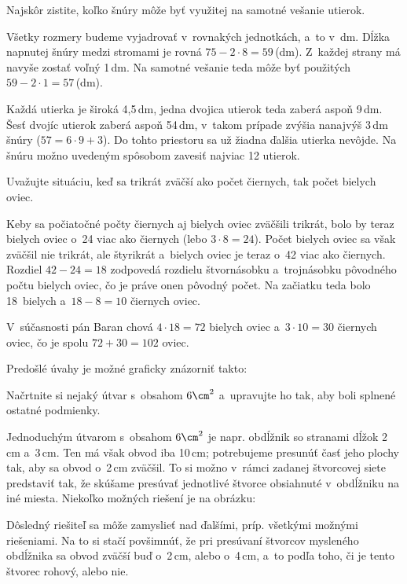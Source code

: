 {%
\napad
Najskôr zistite, koľko šnúry môže byť využitej na samotné vešanie utierok.

\riesenie
Všetky rozmery budeme vyjadrovať v~rovnakých jednotkách, a~to v~dm.
Dĺžka napnutej šnúry medzi stromami je rovná $75-2\cdot 8=59$\,(dm).
Z~každej strany má navyše zostať voľný 1\,dm.
Na samotné vešanie teda môže byť použitých $59-2\cdot 1=57$\,(dm).

Každá utierka je široká 4{,}5\,dm, jedna dvojica utierok teda zaberá
aspoň 9\,dm. Šesť dvojíc utierok zaberá aspoň 54\,dm, v~takom
prípade zvýšia nanajvýš 3\,dm šnúry ($57=6\cdot 9+3$).
Do tohto priestoru sa už žiadna ďalšia utierka nevôjde.
Na šnúru možno uvedeným spôsobom zavesiť najviac 12 utierok.
}

{%
\napad
Uvažujte situáciu, keď sa trikrát zväčší ako počet čiernych, tak počet bielych oviec.

\riesenie
Keby sa počiatočné počty čiernych aj bielych oviec zväčšili trikrát, bolo by
teraz bielych oviec o~24 viac ako čiernych (lebo $3\cdot8=24$). Počet
bielych oviec sa však zväčšil nie trikrát, ale štyrikrát a~bielych oviec
je teraz o~42 viac ako čiernych. Rozdiel $42-24=18$ zodpovedá rozdielu
štvornásobku a~trojnásobku pôvodného počtu bielych oviec, čo je práve onen
pôvodný počet. Na začiatku teda bolo 18~bielych a~$18-8=10$ čiernych oviec.

V~súčasnosti pán Baran chová $4\cdot18=72$ bielych oviec a~$3\cdot10=30$
čiernych oviec, čo je spolu $72+30=102$ oviec.

\poznamka
Predošlé úvahy je možné graficky znázorniť takto:
%

}

{%
\napad
Načrtnite si nejaký útvar s~obsahom $6\cm^2$ a~upravujte ho tak,
aby boli splnené ostatné podmienky.

\riesenie
Jednoduchým útvarom s~obsahom $6\cm^2$ je napr. obdĺžnik so stranami
dĺžok 2\,cm a~3\,cm. Ten má však obvod iba 10\,cm; potrebujeme
presunúť časť jeho plochy tak, aby sa obvod o~2\,cm zväčšil. To si možno
v~rámci zadanej štvorcovej siete predstaviť tak, že skúšame presúvať
jednotlivé štvorce obsiahnuté v~obdĺžniku na iné miesta. Niekoľko možných
riešení je na obrázku:
%


\poznamka
Dôsledný riešiteľ sa môže zamyslieť nad ďalšími, príp. všetkými možnými riešeniami.
Na to si stačí povšimnúť, že pri presúvaní štvorcov mysleného
obdĺžnika sa obvod zväčší buď o~2\,cm, alebo o~4\,cm, a~to podľa toho,
či je tento štvorec rohový, alebo nie.
}

